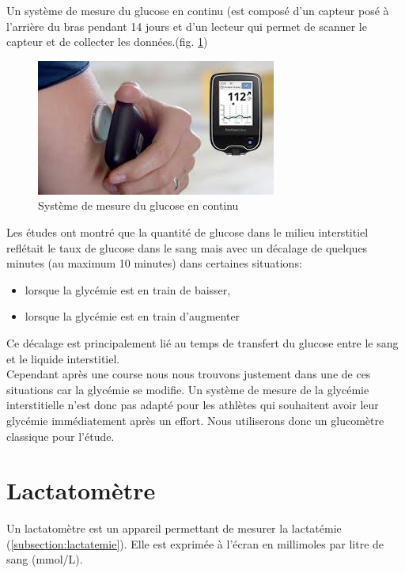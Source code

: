     
    Un système de mesure du glucose en continu (est composé d’un capteur posé à l'arrière du bras pendant 14 jours et d'un lecteur qui permet de scanner le capteur et de collecter les données.(fig. \ref{fig:systemeContinu}) 
    
    \begin{figure}[H]
        \centering
        \includegraphics[scale=0.8]{images/glucometre2.jpg}
        \caption{\label{fig:systemeContinu}Système de mesure du glucose en continu}
    \end{figure}
    
    
    Les études ont montré que la quantité de glucose dans le milieu interstitiel reflétait le taux de glucose dans le sang mais avec un décalage de quelques minutes (au maximum 10 minutes) dans certaines situations:
    \begin{itemize}
        \item lorsque la glycémie est en train de baisser,
        \item lorsque la glycémie est en train d'augmenter\\
    \end{itemize}
    Ce décalage est principalement lié au temps de transfert du glucose entre le sang et le liquide interstitiel.\\
    
    
    Cependant après une course nous nous trouvons justement dans une de ces situations car la glycémie se modifie. Un système de mesure de la glycémie interstitielle  n'est donc pas adapté pour les athlètes qui souhaitent avoir leur glycémie immédiatement après un effort. Nous utiliserons donc un glucomètre classique pour l'étude.
    
    
    \vspace{10pt}
    
    
    \section{Lactatomètre}
    
    Un lactatomètre est un appareil permettant de mesurer la lactatémie (\autoref{subsection:lactatemie}). Elle est exprimée à l'écran en millimoles par litre de sang (mmol/L).\\
    
